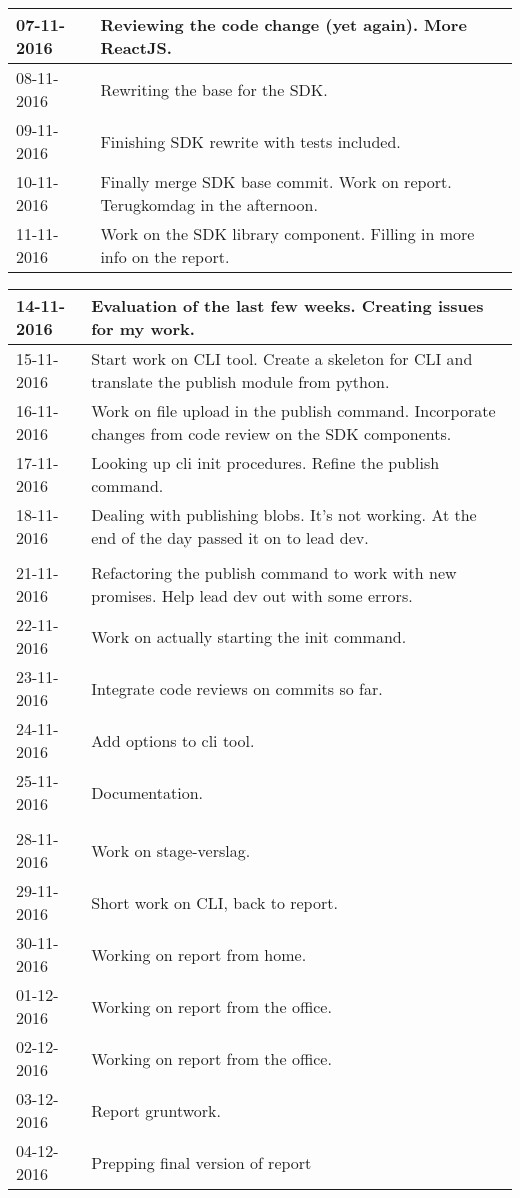 \begin{tabular}{|p{2cm}|p{11cm}|}
	07-11-2016 &  Reviewing the code change (yet again). More ReactJS. \\ \hline
	08-11-2016 &  Rewriting the base for the SDK. \\ \hline
	09-11-2016 &  Finishing SDK rewrite with tests included. \\ \hline
	10-11-2016 &  Finally merge SDK base commit. Work on report. Terugkomdag in the afternoon. \\ \hline
	11-11-2016 &  Work on the SDK library component. Filling in more info on the report. \\ \hline
	
\end{tabular}

\begin{tabular}{|p{2cm}|p{11cm}|}
	\hline
	14-11-2016 &  Evaluation of the last few weeks. Creating issues for my work. \\ \hline
	15-11-2016 &  Start work on CLI tool. Create a skeleton for CLI and translate the publish module from python. \\ \hline
	16-11-2016 &  Work on file upload in the publish command. Incorporate changes from code review on the SDK components. \\ \hline
	17-11-2016 &  Looking up cli init procedures. Refine the publish command. \\ \hline
	18-11-2016 &  Dealing with publishing blobs. It's not working. At the end of the day passed it on to lead dev. \\ \hline
	
	\\ \hline
	
	21-11-2016 &  Refactoring the publish command to work with new promises. Help lead dev out with some errors. \\ \hline
	22-11-2016 &  Work on actually starting the init command. \\ \hline
	23-11-2016 &  Integrate code reviews on commits so far. \\ \hline
	24-11-2016 &  Add options to cli tool. \\ \hline
	25-11-2016 &  Documentation. \\ \hline
	
	\\ \hline
	
	28-11-2016 &  Work on stage-verslag. \\ \hline
	29-11-2016 &  Short work on CLI, back to report. \\ \hline
	30-11-2016 &  Working on report from home. \\ \hline
	01-12-2016 &  Working on report from the office. \\ \hline
	02-12-2016 &  Working on report from the office. \\ \hline
	03-12-2016 &  Report gruntwork. \\ \hline
	04-12-2016 &  Prepping final version of report \\ \hline
	

\end{tabular}
